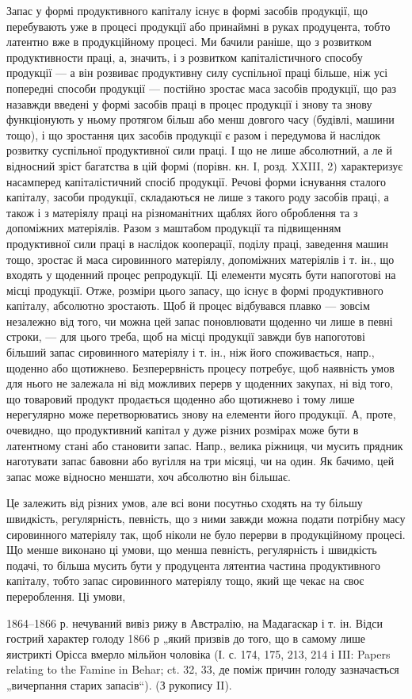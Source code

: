 
Запас у формі продуктивного капіталу існує в формі засобів продукції,
що перебувають уже в процесі продукції або принаймні в руках
продуцента, тобто латентно вже в продукційному процесі. Ми бачили
раніше, що з розвитком продуктивности праці, а, значить, і з розвитком
капіталістичного способу продукції — а він розвиває продуктивну
силу суспільної праці більше, ніж усі попередні способи продукції —
постійно зростає маса засобів продукції, що раз назавжди введені
у формі засобів праці в процес продукції і знову та знову
функціонують у ньому протягом більш або менш довгого часу (будівлі,
машини тощо), і що зростання цих засобів продукції є разом і передумова
й наслідок розвитку суспільної продуктивної сили праці. І що не
лише абсолютний, а ле й відносний зріст багатства в цій формі (порівн.
кн. І, розд. XXIII, 2) характеризує насамперед капіталістичний спосіб
продукції. Речові форми існування сталого капіталу, засоби продукції,
складаються не лише з такого роду засобів праці, а також і з матеріялу
праці на різноманітних щаблях його оброблення та з допоміжних матеріялів.
Разом з маштабом продукції та підвищенням продуктивної сили
праці в наслідок кооперації, поділу праці, заведення машин тощо, зростає
й маса сировинного матеріялу, допоміжних матеріялів і т. ін., що
входять у щоденний процес репродукції. Ці елементи мусять бути напоготові
на місці продукції. Отже, розміри цього запасу, що існує в формі продуктивного
капіталу, абсолютно зростають. Щоб й процес відбувався плавко —
зовсім незалежно від того, чи можна цей запас поновлювати щоденно чи
лише в певні строки, — для цього треба, щоб на місці продукції завжди
був напоготові більший запас сировинного матеріялу і т. ін., ніж його
споживається, напр., щоденно або щотижнево. Безперервність процесу
потребує, щоб наявність умов для нього не залежала ні від можливих
перерв у щоденних закупах, ні від того, що товаровий продукт продається
щоденно або щотижнево і тому лише нерегулярно може перетворюватись
знову на елементи його продукції. А, проте, очевидно, що
продуктивний капітал у дуже різних розмірах може бути в латентному
стані або становити запас. Напр., велика ріжниця, чи мусить прядник
наготувати запас бавовни або вугілля на три місяці, чи на один. Як
бачимо, цей запас може відносно меншати, хоч абсолютно він більшає.

Це залежить від різних умов, але всі вони посутньо сходять на ту
більшу швидкість, регулярність, певність, що з ними завжди можна подати
потрібну масу сировинного матеріялу так, щоб ніколи не було перерви
в продукційному процесі. Що менше виконано ці умови, що менша
певність, регулярність і швидкість подачі, то більша мусить бути у продуцента
лятентиа частина продуктивного капіталу, тобто запас сировинного
матеріялу тощо, який ще чекає на своє перероблення. Ці умови,

1864--1866 р. нечуваний вивіз рижу в Австралію, на Мадагаскар і т. ін. Відси
гострий характер голоду 1866 р „який призвів до того, що в самому лише
яистрикті Орісса вмерло мільйон чоловіка (І. с. 174, 175, 213, 214 і III: Papers relating
to the Famine in Behar; ct. 32, 33, де поміж причин голоду зазначається „вичерпання старих запасів“).
(З рукопису II).
\parbreak{}  %
